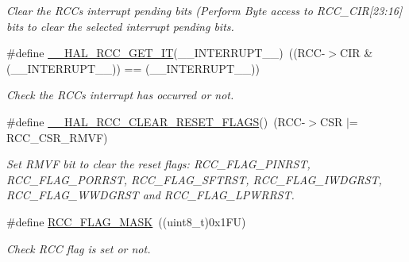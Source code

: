 \begin{DoxyCompactItemize}
\begin{DoxyCompactList}\small\item\em Clear the R\+CC\textquotesingle{}s interrupt pending bits (Perform Byte access to R\+C\+C\+\_\+\+C\+IR\mbox{[}23\+:16\mbox{]} bits to clear the selected interrupt pending bits. \end{DoxyCompactList}\item 
\#define \hyperlink{group___r_c_c___flags___interrupts___management_ga134af980b892f362c05ae21922cd828d}{\+\_\+\+\_\+\+H\+A\+L\+\_\+\+R\+C\+C\+\_\+\+G\+E\+T\+\_\+\+IT}(\+\_\+\+\_\+\+I\+N\+T\+E\+R\+R\+U\+P\+T\+\_\+\+\_\+)~((R\+CC-\/$>$C\+IR \& (\+\_\+\+\_\+\+I\+N\+T\+E\+R\+R\+U\+P\+T\+\_\+\+\_\+)) == (\+\_\+\+\_\+\+I\+N\+T\+E\+R\+R\+U\+P\+T\+\_\+\+\_\+))
\begin{DoxyCompactList}\small\item\em Check the R\+CC\textquotesingle{}s interrupt has occurred or not. \end{DoxyCompactList}\item 
\mbox{\label{group___r_c_c___flags___interrupts___management_gaf28c11b36035ef1e27883ff7ee2c46b0}} 
\#define \hyperlink{group___r_c_c___flags___interrupts___management_gaf28c11b36035ef1e27883ff7ee2c46b0}{\+\_\+\+\_\+\+H\+A\+L\+\_\+\+R\+C\+C\+\_\+\+C\+L\+E\+A\+R\+\_\+\+R\+E\+S\+E\+T\+\_\+\+F\+L\+A\+GS}()~(R\+CC-\/$>$C\+SR $\vert$= R\+C\+C\+\_\+\+C\+S\+R\+\_\+\+R\+M\+VF)
\begin{DoxyCompactList}\small\item\em Set R\+M\+VF bit to clear the reset flags\+: R\+C\+C\+\_\+\+F\+L\+A\+G\+\_\+\+P\+I\+N\+R\+ST, R\+C\+C\+\_\+\+F\+L\+A\+G\+\_\+\+P\+O\+R\+R\+ST, R\+C\+C\+\_\+\+F\+L\+A\+G\+\_\+\+S\+F\+T\+R\+ST, R\+C\+C\+\_\+\+F\+L\+A\+G\+\_\+\+I\+W\+D\+G\+R\+ST, R\+C\+C\+\_\+\+F\+L\+A\+G\+\_\+\+W\+W\+D\+G\+R\+ST and R\+C\+C\+\_\+\+F\+L\+A\+G\+\_\+\+L\+P\+W\+R\+R\+ST. \end{DoxyCompactList}\item 
\#define \hyperlink{group___r_c_c___flags___interrupts___management_ga80017c6bf8a5c6f53a1a21bb8db93a82}{R\+C\+C\+\_\+\+F\+L\+A\+G\+\_\+\+M\+A\+SK}~((uint8\+\_\+t)0x1\+F\+U)
\begin{DoxyCompactList}\small\item\em Check R\+CC flag is set or not. \end{DoxyCompactList}\item 
\mbox{\label{group___r_c_c___flags___interrupts___management_gae2d7d461630562bf2a2ddb31b1f96449}} 

\end{DoxyCompactItemize}
